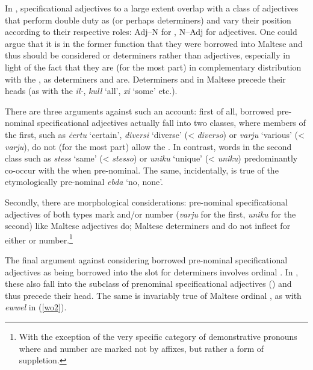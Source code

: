 \documentclass[output=paper]{langsci/langscibook}
\begin{document}
In , specificational adjectives to a large extent overlap with a class of adjectives that perform double duty as  (or perhaps determiners) and vary their position according to their respective roles: Adj--N for , N--Adj for adjectives. One could argue that it is in the former function that they were borrowed into Maltese and thus should be considered  or determiners rather than adjectives, especially in light of the fact that they are (for the most part) in complementary distribution with the  , as determiners and  are. Determiners and  in Maltese precede their heads (as with the   \textit{il-}, \textit{kull} `all', \textit{xi} `some' etc.).

There are three arguments against such an account: first of all, borrowed pre-nominal specificational adjectives actually fall into two classes, where members of the first, such as \textit{ċertu} `certain', \textit{diversi} `diverse' (<  \textit{diverso}) or \textit{varju} `various' (<  \textit{varju}), do not (for the most part) allow the  . In contrast, words in the second class such as \textit{stess} `same' (<  \textit{stesso}) or \textit{uniku} `unique' (<  \textit{uniku}) predominantly co-occur with the   when pre-nominal. The same, incidentally, is true of the etymologically  pre-nominal  \textit{ebda} `no, none'.

Secondly, there are morphological considerations: pre-nominal specificational adjectives of both types mark  and/or number (\textit{varju} for the first, \textit{uniku} for the second) like Maltese adjectives do; Maltese determiners and  do not inflect for either  or number.\footnote{With the exception of the very specific category of demonstrative pronouns where  and number are marked not by affixes, but rather a form of suppletion.}

The final argument against considering borrowed pre-nominal specificational adjectives as being borrowed into the slot for determiners involves ordinal . In , these also fall into the subclass of prenominal specificational adjectives (\citealt[55]{italian2007}) and thus precede their head. The same is invariably true of Maltese ordinal , as with \textit{ewwel} in (\ref{wo2}).
\end{document}
